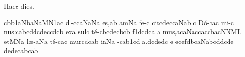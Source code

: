 
\beginhymn Haec dies.

\initiumgregorianum
{}%
\sgn {}{\AE}c\bmolle b\episem b1\clivis aN\climacus baN\clivis aM\episem N1\pes ac\egn
\spatium
\sgn di-\bivirga c\spatiumparvum\climacus caN\porrectus aNa\egn
\sgn { }e{s,}\punctum a\augmentum b\egn
\spatium
\Asteriscus
\divisiominor
\spatium
{}am\pes Na\egn
\spatium
\sgn fe-\bivirga c\egn
\sgn cit\bivirga c\torculus dec\climacus caN\punctum a\augmentum b\egn
\spatium
\divisiominima
\spatium
\custos c
\lineaproxima
\sgn D{\'o}-\porrectus cac\egn
\sgn mi-\trivirga c\egn
\sgn nu{s:}\clivis ca\spatiumparvum\quilismapes bc\virga d\augmentum d\pes cd\clivis ec\spatiumparvum\punctum c\pressus dc\augmentum b\egn
\spatium
\divisiomaior
\spatium
\sgn {}ex\punctum a\egn
\sgn sul\punctum c\egn
\sgn t{\'e}-\clivis cb\pes cd\nonspatium\climacus ecb\spatiumparvum\pressus cb\egn
\spatium
\divisiominima
\spatium
\sgn { }{}{}\episem f1\clivis dc\spatiumparvum\virga d\spatiumparvum\punctuminclinatum c\spatiumparvum\punctuminclinatum a\egn
\custos a
\lineaproxima
\sgn mu{s,}\pessubbipunctis acaN\spatiumparvum\pes ac\clivis ca\virga c\climacus cba\clivis cN\clivis NM\augmentum L\egn
\spatium
\divisiomaior
\spatium
\sgn {}et\Salicus MNa\egn
\spatium
\sgn l{\ae}-\porrectus aNa\egn
\sgn t{\'e}-\clivis ca\trivirga c\egn
\sgn mur\pes cd\spatiumparvum\punctuminclinatum c\spatiumparvum\punctuminclinatum a\augmentum  b\egn
\spatium
\divisiominor
\spatium
\sgn {}in\pes Na\egn
\spatium
{}-\clivis ca\spatiumparvum\episem b1\pes cd\egn
\sgn {}a.\clivis dc\pessubbipunctis dedc\egn
\spatium
\divisiominima
\spatium
\custos e
\lineaproxima
\sgn { }{}{}\clivis ec\pes ef\spatiumparvum\punctuminclinatum d\spatiumparvum\punctuminclinatum b\climacus caN\quilismascandicus abc\nonspatium\virga d\augmentum d\Salicus cde\egn
\spatium
\divisiominima
\spatium
\sgn { }{}{}\torculusresupinus dede\spatiumparvum\punctuminclinatum c\spatiumparvum\punctuminclinatum a\spatiumparvum\quilismatorculus bca\augmentum b\egn
\spatium
\Finisgregoriana

